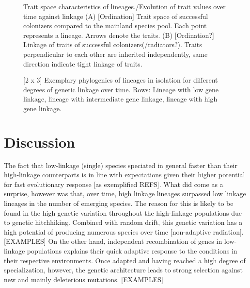 \documentclass[a4paper]{scrartcl}
\begin{document}
\begin{figure}
  \caption{Trait space characteristics of lineages./Evolution of trait values over time against linkage
    (A) [Ordination] Trait space of successful colonizers compared to the mainland species pool. Each point represents a lineage.
    Arrows denote the traits.
    (B) [Ordination?] Linkage of traits of successful colonizers(/radiators?). Traits perpendicular to each other are inherited independently,
  same direction indicate tight linkage of traits.}
  \label{traitspace}
\end{figure}

\begin{figure}
  \caption{[2 x 3]
    Exemplary phylogenies of lineages in isolation for different degrees of genetic linkage over time.
    Rows: Lineage with low gene linkage,
    lineage with intermediate gene linkage,
    lineage with high gene linkage.}
  \label{phylogenies}
\end{figure}

\section{Discussion}


The fact that low-linkage (single) species speciated in general faster than their high-linkage counterparts
is in line with expectations given their higher potential for fast evolutionary response [as exemplified REFS].
What did come as a surprise, however was that, over time, high linkage lineages surpassed low linkage lineages
in the number of emerging species.
The reason for this is likely to be found in the high genetic variation throughout the high-linkage populations
due to genetic hitchhiking.
Combined with random drift, this genetic variation has a high potential of producing numerous species over time [non-adaptive radiation].
[EXAMPLES]
On the other hand, independent recombination of genes in low-linkage populations explains their quick adaptive response
to the conditions in their respective environments.
Once adapted and having reached a high degree of specialization, however, the genetic architecture leads to strong selection against
new and mainly deleterious mutations.
[EXAMPLES]
\end{document}
